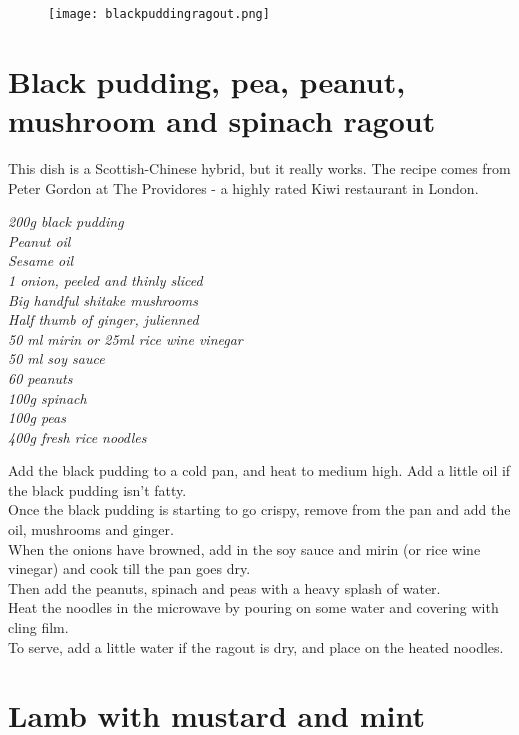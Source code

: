 \documentclass{tufte-book}
\begin{document}

\begin{figure}[h]
  \texttt{[image: blackpuddingragout.png]}
\end{figure}

\section{Black pudding, pea, peanut, mushroom and spinach ragout}

This dish is a Scottish-Chinese hybrid, but it really works. The recipe comes from Peter Gordon at The Providores - a highly rated Kiwi restaurant in London.

\smallskip
\emph{200g black pudding
\\Peanut oil
\\Sesame oil
\\1 onion, peeled and thinly sliced
\\Big handful shitake mushrooms
\\Half thumb of ginger, julienned
\\50 ml mirin or 25ml rice wine vinegar
\\50 ml soy sauce
\\60 peanuts
\\100g spinach
\\100g peas
\\400g fresh rice noodles
}

\smallskip
Add the black pudding to a cold pan, and heat to medium high. Add a little oil if the black pudding isn't fatty. 
\\Once the black pudding is starting to go crispy, remove from the pan and add the oil, mushrooms and ginger.
\\When the onions have browned, add in the soy sauce and mirin (or rice wine vinegar) and cook till the pan goes dry.
\\Then add the peanuts, spinach and peas with a heavy splash of water.
\\Heat the noodles in the microwave by pouring on some water and covering with cling film.
\\To serve, add a little water if the ragout is dry, and place on the heated noodles.



\section{Lamb with mustard and mint}
\end{document}
